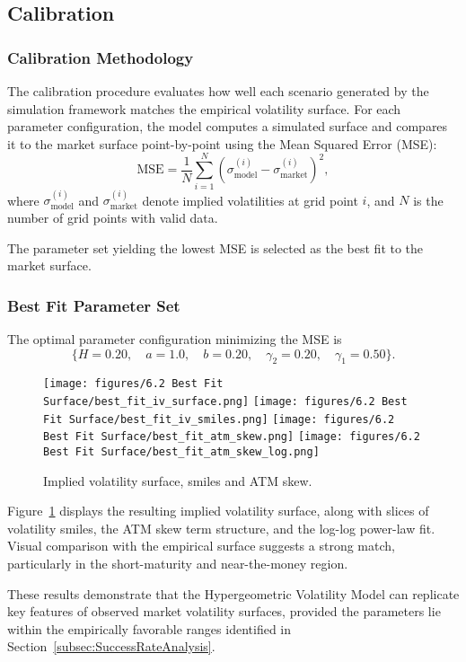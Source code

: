 \subsection{Calibration}

\subsubsection*{Calibration Methodology}
The calibration procedure evaluates how well each scenario generated by the simulation framework matches the empirical volatility surface. For each parameter configuration, the model computes a simulated surface and compares it to the market surface point-by-point using the Mean Squared Error (MSE):
\begin{equation}
    \text{MSE} = \frac{1}{N} \sum_{i=1}^{N} \left( \sigma_{\text{model}}^{(i)} - \sigma_{\text{market}}^{(i)} \right)^2,    
\end{equation}
where $\sigma_{\text{model}}^{(i)}$ and $\sigma_{\text{market}}^{(i)}$ denote implied volatilities at grid point $i$, and $N$ is the number of grid points with valid data.

The parameter set yielding the lowest MSE is selected as the best fit to the market surface.

\subsubsection*{Best Fit Parameter Set}
The optimal parameter configuration minimizing the MSE is
\begin{equation*}
    \{ H = 0.20,\quad a = 1.0,\quad b = 0.20,\quad \gamma_2 = 0.20,\quad \gamma_1 = 0.50 \}.
\end{equation*}

\begin{figure}[H]
    \centering
    \texttt{[image: figures/6.2 Best Fit Surface/best\_fit\_iv\_surface.png]}
    \texttt{[image: figures/6.2 Best Fit Surface/best\_fit\_iv\_smiles.png]}
    \texttt{[image: figures/6.2 Best Fit Surface/best\_fit\_atm\_skew.png]}
    \texttt{[image: figures/6.2 Best Fit Surface/best\_fit\_atm\_skew\_log.png]}
    \caption{Implied volatility surface, smiles and ATM skew.}
    \label{fig:BestFitSurface}
\end{figure}

Figure~\ref{fig:BestFitSurface} displays the resulting implied volatility surface, along with slices of volatility smiles, the ATM skew term structure, and the log-log power-law fit. Visual comparison with the empirical surface suggests a strong match, particularly in the short-maturity and near-the-money region.

These results demonstrate that the Hypergeometric Volatility Model can replicate key features of observed market volatility surfaces, provided the parameters lie within the empirically favorable ranges identified in Section~\ref{subsec:SuccessRateAnalysis}.
